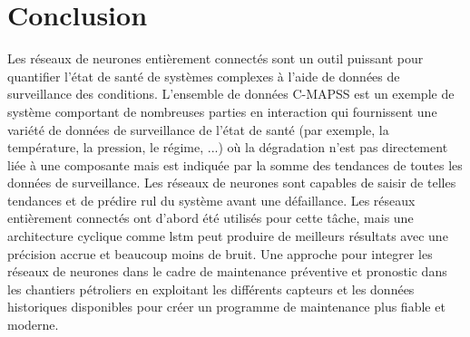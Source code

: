 \section{Conclusion}
Les réseaux de neurones entièrement connectés sont un outil puissant pour quantifier l'état de santé de systèmes complexes à l'aide de données de surveillance des conditions. L'ensemble de données C-MAPSS est un exemple de système comportant de nombreuses parties en interaction qui fournissent une variété de données de surveillance de l'état de santé (par exemple, la température, la pression, le régime, ...) où la dégradation n'est pas directement liée à une composante mais est indiquée par la somme des tendances de toutes les données de surveillance. Les réseaux de neurones sont capables de saisir de telles tendances et de prédire \acrshort{rul} du système avant une défaillance. Les réseaux entièrement connectés ont d'abord été utilisés pour cette tâche, mais une architecture cyclique comme \acrshort{lstm} peut produire de meilleurs résultats avec une précision accrue et beaucoup moins de bruit. Une approche pour integrer les réseaux de neurones dans le cadre de maintenance préventive et pronostic dans les chantiers pétroliers en exploitant les différents capteurs et les données historiques disponibles pour créer un programme de maintenance plus fiable et moderne.
